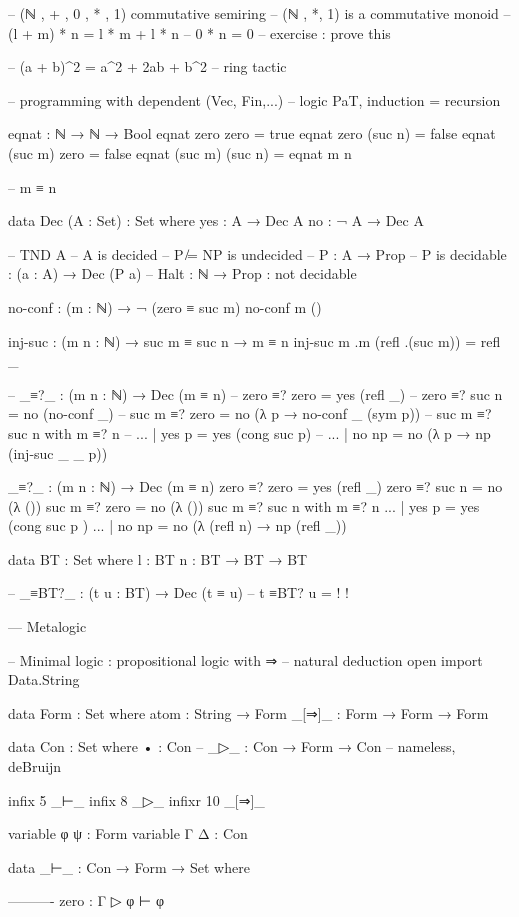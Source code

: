-- (ℕ , + , 0 , * , 1) commutative semiring
-- (ℕ , *, 1) is a commutative monoid
-- (l + m) * n = l * m + l * n
-- 0 * n = 0
-- exercise : prove this 

-- (a + b)^2 = a^2 + 2ab + b^2
-- ring tactic 

-- programming with dependent (Vec, Fin,...)
-- logic PaT, induction = recursion

eqnat : ℕ → ℕ → Bool
eqnat zero zero = true
eqnat zero (suc n) = false
eqnat (suc m) zero = false
eqnat (suc m) (suc n) = eqnat m n

-- m ≡ n 

data Dec (A : Set) : Set where
    yes : A → Dec A
    no : ¬ A → Dec A

-- TND A 
-- A is decided 
-- P ̸= NP is undecided 
-- P : A → Prop
-- P is decidable : (a : A) → Dec (P a)
-- Halt : ℕ → Prop : not decidable

no-conf : (m : ℕ) → ¬ (zero ≡ suc m)
no-conf m ()

inj-suc : (m n : ℕ) → suc m ≡ suc n → m ≡ n
inj-suc m .m (refl .(suc m)) = refl _

-- _≡?_ : (m n : ℕ) → Dec (m ≡ n)
-- zero ≡? zero = yes (refl _)
-- zero ≡? suc n = no (no-conf _)
-- suc m ≡? zero = no (λ p → no-conf _ (sym p))
-- suc m ≡? suc n with m ≡? n
-- ... | yes p = yes (cong suc p)
-- ... | no np = no (λ p → np (inj-suc _ _ p))

_≡?_ : (m n : ℕ) → Dec (m ≡ n)
zero ≡? zero = yes (refl _)
zero ≡? suc n = no (λ ())
suc m ≡? zero = no (λ ())
suc m ≡? suc n with m ≡? n
... | yes p = yes (cong suc p )
... | no np = no (λ {(refl n) → np (refl _)})

data BT : Set where
    l : BT
    n : BT → BT → BT

-- _≡BT?_ : (t u : BT) → Dec (t ≡ u)
-- t ≡BT? u = {!   !}

--- Metalogic

-- Minimal logic : propositional logic with ⇒ 
-- natural deduction 
open import Data.String

data Form : Set where
 atom : String → Form
 _[⇒]_ : Form → Form → Form

data Con : Set where
  • : Con -- \bu
  _▷_ : Con → Form → Con
-- nameless, deBruijn 

infix 5 _⊢_
infix 8 _▷_
infixr 10 _[⇒]_

variable φ ψ : Form
variable Γ Δ : Con 

data _⊢_ : Con → Form → Set where

           ----------
    zero : Γ ▷ φ ⊢ φ

